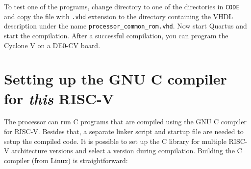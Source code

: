 \documentclass[12pt]{article}
\begin{document}
To test one of the programs, change directory to one of the directories in \texttt{CODE} and copy the file with \texttt{.vhd} extension to the directory containing the VHDL description under the name \texttt{processor\_common\_rom.vhd}.
Now start Quartus and start the compilation. After a successful compilation, you can program the Cyclone V on a DE0-CV board.

\section{Setting up the GNU C compiler for \textit{this} RISC-V}
\label{sec:ccompiler}
The processor can run C programs that are compiled using the GNU C compiler for RISC-V. Besides that, a separate linker script and startup file are needed to setup the compiled code. It is possible to set up the C library for multiple RISC-V architecture versions and select a version during compilation. Building the C compiler (from Linux) is straightforward:
\end{document}

